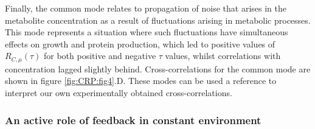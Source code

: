 %
Finally, the common mode relates to propagation of noise that arises in the metabolite concentration as a result of fluctuations arising in metabolic processes.
This mode represents a situation where such fluctuations have simultaneous effects on growth and protein production, which led to positive values of $R_{C,\mu}(\tau)$ for both 
positive and negative $\tau$ values, whilst correlations with concentration lagged slightly behind.
Cross-correlations for the common mode are shown in figure \ref{fig:CRP:fig4}.D.
%
These modes can be used a reference to interpret our own experimentally obtained cross-correlations.





\subsubsection{An active role of feedback in constant environment}


